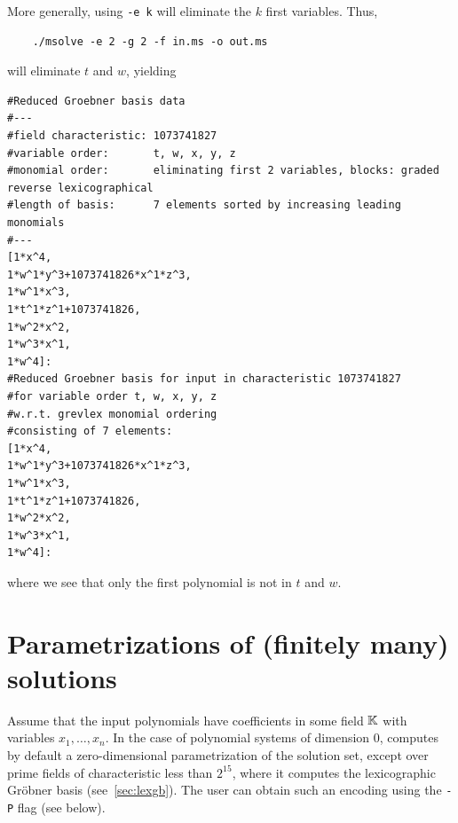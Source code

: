 \documentclass[a4paper,english,11pt]{scrartcl}
\theoremstyle{definition}
\theoremstyle{remark}
\begin{document}
More generally, using \verb+-e k+ will eliminate the $k$ first
variables. Thus,
\begin{tcolorbox} %
  \begin{verbatim}
    ./msolve -e 2 -g 2 -f in.ms -o out.ms
  \end{verbatim}
\end{tcolorbox}
will eliminate $t$ and $w$, yielding
\begin{tcolorbox} %
  \begin{lstlisting}
#Reduced Groebner basis data
#---
#field characteristic: 1073741827
#variable order:       t, w, x, y, z
#monomial order:       eliminating first 2 variables, blocks: graded reverse lexicographical
#length of basis:      7 elements sorted by increasing leading monomials
#---
[1*x^4,
1*w^1*y^3+1073741826*x^1*z^3,
1*w^1*x^3,
1*t^1*z^1+1073741826,
1*w^2*x^2,
1*w^3*x^1,
1*w^4]:
#Reduced Groebner basis for input in characteristic 1073741827
#for variable order t, w, x, y, z
#w.r.t. grevlex monomial ordering
#consisting of 7 elements:
[1*x^4,
1*w^1*y^3+1073741826*x^1*z^3,
1*w^1*x^3,
1*t^1*z^1+1073741826,
1*w^2*x^2,
1*w^3*x^1,
1*w^4]:
  \end{lstlisting}
\end{tcolorbox}
where we see that only the first polynomial is not in $t$ and $w$.

\section{Parametrizations of (finitely many) solutions}
\label{sec:param}

Assume that the input polynomials have coefficients in some field $\mathbb{K}$ with
variables $x_1, \ldots, x_n$. In the case of polynomial systems of dimension
$0$, \msolve computes by default a zero-dimensional parametrization of the
solution set, except over prime fields of characteristic less than $2^{15}$,
where it computes the lexicographic Gr\"obner basis (see~\cref{sec:lexgb}).
The user can obtain such an encoding using the \verb+-P+ flag (see below).
\end{document}
